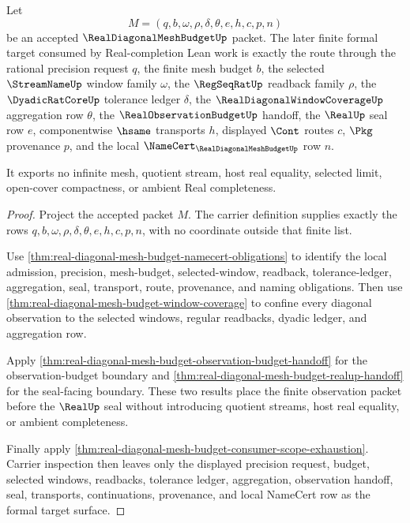 \begin{theorem}
\label{thm:real-diagonal-mesh-budget-formal-target-surface}
Let
$$
M=(q,b,\omega,\rho,\delta,\theta,e,h,c,p,n)
$$
be an accepted $\RealDiagonalMeshBudgetUp$ packet. The later finite formal target consumed by Real-completion Lean work is exactly the route through the rational precision request $q$, the finite mesh budget $b$, the selected $\StreamNameUp$ window family $\omega$, the $\RegSeqRatUp$ readback family $\rho$, the $\DyadicRatCoreUp$ tolerance ledger $\delta$, the $\RealDiagonalWindowCoverageUp$ aggregation row $\theta$, the $\RealObservationBudgetUp$ handoff, the $\RealUp$ seal row $e$, componentwise $\hsame$ transports $h$, displayed $\Cont$ routes $c$, $\Pkg$ provenance $p$, and the local $\NameCert_{\RealDiagonalMeshBudgetUp}$ row $n$.

It exports no infinite mesh, quotient stream, host real equality, selected limit, open-cover compactness, or ambient Real completeness.
\end{theorem}
\begin{proof}
Project the accepted packet $M$. The carrier definition supplies exactly the rows $q,b,\omega,\rho,\delta,\theta,e,h,c,p,n$, with no coordinate outside that finite list.

Use \autoref{thm:real-diagonal-mesh-budget-namecert-obligations} to identify the local admission, precision, mesh-budget, selected-window, readback, tolerance-ledger, aggregation, seal, transport, route, provenance, and naming obligations. Then use \autoref{thm:real-diagonal-mesh-budget-window-coverage} to confine every diagonal observation to the selected windows, regular readbacks, dyadic ledger, and aggregation row.

Apply \autoref{thm:real-diagonal-mesh-budget-observation-budget-handoff} for the observation-budget boundary and \autoref{thm:real-diagonal-mesh-budget-realup-handoff} for the seal-facing boundary. These two results place the finite observation packet before the $\RealUp$ seal without introducing quotient streams, host real equality, or ambient completeness.

Finally apply \autoref{thm:real-diagonal-mesh-budget-consumer-scope-exhaustion}. Carrier inspection then leaves only the displayed precision request, budget, selected windows, readbacks, tolerance ledger, aggregation, observation handoff, seal, transports, continuations, provenance, and local NameCert row as the formal target surface.
\end{proof}

